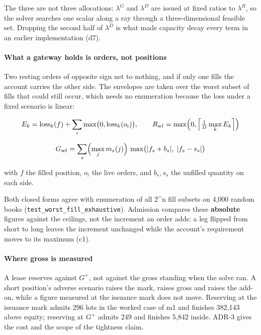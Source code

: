 \documentclass[10pt,a4paper]{article}
\begin{document}
The three are not three allocations: \(\lambda^{G}\) and \(\lambda^{D}\) are issued at fixed ratios
to \(\lambda^{R}\), so the solver searches one scalar along a ray through a
three-dimensional feasible set. Dropping the second half of \(\lambda^{D}\) is what made
capacity decay every term in an earlier implementation (d7).

\paragraph{What a gateway holds is orders, not positions}\label{what-a-gateway-holds-is-orders-not-positions}

Two resting orders of opposite sign net to nothing, and if only one fills the
account carries the other side. The envelopes are taken over the worst subset of
fills that could still occur, which needs no enumeration because the loss under a
fixed scenario is linear:

\[
E_k=\operatorname{loss}_k(f)+\sum_i \max\bigl(0,\operatorname{loss}_k(o_i)\bigr),
\qquad
R_{\mathrm{wf}}=\max\Bigl(0,\Bigl\lceil \tfrac{1}{D}\max_k E_k \Bigr\rceil\Bigr)
\]

\[
G_{\mathrm{wf}}=\sum_s \Bigl(\max_{j} m_s(j)\Bigr)\,
\max\bigl(|f_s+b_s|,\;|f_s-s_s|\bigr)
\]

with \(f\) the filled position, \(o_i\) the live orders, and \(b_s,s_s\) the unfilled
quantity on each side.

Both closed forms agree with enumeration of all 2\^{}n fill subsets on 4,000 random
books (\texttt{test\_worst\_fill\_exhaustive}). Admission compares these \textbf{absolute}
figures against the ceilings, not the increment an order adds: a leg flipped from
short to long leaves the increment unchanged while the account's requirement moves
to its maximum (c1).

\paragraph{Where gross is measured}\label{where-gross-is-measured}

A lease reserves against \(G^{+}\), not against the gross standing when the solve ran.
A short position's adverse scenario raises the mark, raises gross and raises the
add-on, while a figure measured at the issuance mark does not move. Reserving at
the issuance mark admits 296 lots in the worked case of m1 and finishes 382,143
above equity; reserving at \(G^{+}\) admits 249 and finishes 5,842 inside. ADR-3 gives
the cost and the scope of the tightness claim.
\end{document}
